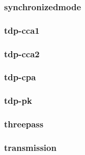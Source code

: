 \begin{frame}\frametitle{synchronizedmode}
\begin{figure}
\begin{center}

\end{center}
\end{figure}
\end{frame}
\begin{frame}\frametitle{tdp-cca1}
\begin{figure}
\begin{center}

\end{center}
\end{figure}
\end{frame}
\begin{frame}\frametitle{tdp-cca2}
\begin{figure}
\begin{center}

\end{center}
\end{figure}
\end{frame}
\begin{frame}\frametitle{tdp-cpa}
\begin{figure}
\begin{center}

\end{center}
\end{figure}
\end{frame}
\begin{frame}\frametitle{tdp-pk}
\begin{figure}
\begin{center}

\end{center}
\end{figure}
\end{frame}
\begin{frame}\frametitle{threepass}
\begin{figure}
\begin{center}

\end{center}
\end{figure}
\end{frame}
\begin{frame}\frametitle{transmission}
\begin{figure}
\begin{center}

\end{center}
\end{figure}
\end{frame}
